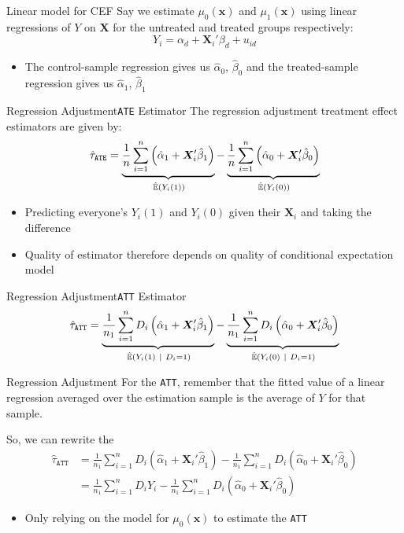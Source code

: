 \documentclass[aspectratio=169,t,11pt,table]{beamer}
\begin{document}
\begin{frame}{Linear model for CEF}
  Say we estimate $\mu_0(\bm{x})$ and $\mu_1(\bm{x})$ using linear regressions of $Y$ on $\bm{X}$ for the untreated and treated groups respectively:
  $$
    Y_i = \alpha_{d} + \bm{X}_{i}' \beta_d + u_{id}
  $$
  \begin{itemize}
    \item The control-sample regression gives us $\hat{\alpha}_{0}$, $\hat{\beta}_{0}$ and the treated-sample regression gives us $\hat{\alpha}_{1}$, $\hat{\beta}_{1}$
  \end{itemize}
\end{frame}

\begin{frame}{Regression Adjustment}{\texttt{ATE} Estimator}
  The \alert{regression adjustment treatment effect estimators} are given by:
  $$
    \hat{\tau}_{\texttt{ATE}} = 
    \underbrace{
      \frac{1}{n} \sum_{i=1}^n \left( \hat{\alpha}_1 + \bm{X}_i' \hat{\beta}_1 \right)
    }_{\expechat{Y_i(1)}} -
    \underbrace{
      \frac{1}{n} \sum_{i=1}^n \left( \hat{\alpha}_0 + \bm{X}_i' \hat{\beta}_0 \right)
    }_{\expechat{Y_i(0)}} 
  $$
  \begin{itemize}
    \item Predicting everyone's $Y_i(1)$ and $Y_i(0)$ given their $\bm{X}_i$ and taking the difference
    \item Quality of estimator therefore depends on quality of conditional expectation model
  \end{itemize}
\end{frame}

\begin{frame}{Regression Adjustment}{\texttt{ATT} Estimator}
  $$
    \hat{\tau}_{\texttt{ATT}} = 
    \underbrace{
      \frac{1}{n_1} \sum_{i=1}^n D_i \left( \hat{\alpha}_1 + \bm{X}_i' \hat{\beta}_1 \right)
    }_{\expechat{Y_i(1)}{D_i = 1}} - 
    \underbrace{
      \frac{1}{n_1} \sum_{i=1}^n D_i \left( \hat{\alpha}_0 + \bm{X}_i' \hat{\beta}_0 \right)
    }_{\expechat{Y_i(0)}{D_i = 1}} 
  $$
\end{frame}

\begin{frame}{Regression Adjustment}
  For the \texttt{ATT}, remember that the fitted value of a linear regression averaged over the estimation sample is the average of $Y$ for that sample.
  
  \bigskip
  So, we can rewrite the 
  \begin{align*}
    \hat{\tau}_{\texttt{ATT}} &= 
    \frac{1}{n_1} \sum_{i=1}^n D_i \left( \hat{\alpha}_1 + \bm{X}_i' \hat{\beta}_1 \right) -
    \frac{1}{n_1} \sum_{i=1}^n D_i \left( \hat{\alpha}_0 + \bm{X}_i' \hat{\beta}_0 \right) \\ 
    &= \frac{1}{n_1} \sum_{i=1}^n D_i Y_i - 
    \frac{1}{n_1} \sum_{i=1}^n D_i \left( \hat{\alpha}_0 + \bm{X}_i' \hat{\beta}_0 \right) 
  \end{align*}
  \begin{itemize}
    \item Only relying on the model for $\mu_{0}(\bm{x})$ to estimate the \texttt{ATT}
  \end{itemize}
\end{frame}
\end{document}
